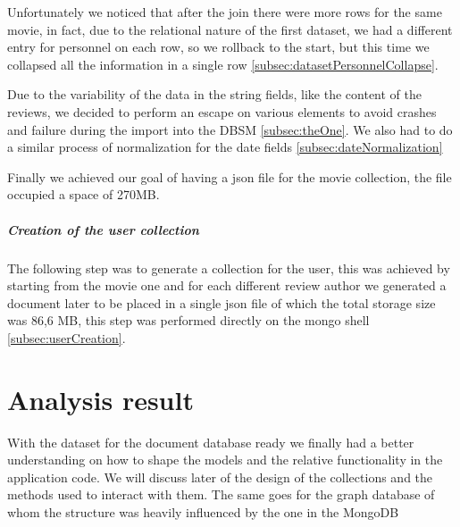 Unfortunately we noticed that after the join there were more rows for the same movie, in fact, due to the relational nature of the first dataset, we had a different entry for personnel on each row, so we rollback to the start, but this time we collapsed all the information in a single row \cref{subsec:datasetPersonnelCollapse}.

Due to the variability of the data in the string fields, like the content of the reviews, we decided to perform an escape on various elements to avoid crashes and failure during the import into the DBSM \cref{subsec:theOne}. We also had to do a similar process of normalization for the date fields \cref{subsec:dateNormalization}


Finally we achieved our goal of having a json file for the movie collection, the file occupied a space of 270MB.

\subparagraph{Creation of the user collection}
The following step was to generate a collection for the user, this was achieved by starting from the movie one and for each different review author we generated a document later to be placed in a single json file of which the total storage size was 86,6 MB, this step was performed directly on the mongo shell \cref{subsec:userCreation}. 

\section{Analysis result}\label{sec:result}
With the dataset for the document database ready we finally had a better understanding on how to shape the models and the relative functionality in the application code. We will discuss later of the design of the collections and the methods used to interact with them. The same goes for the graph database of whom the structure was heavily influenced by the one in the MongoDB
